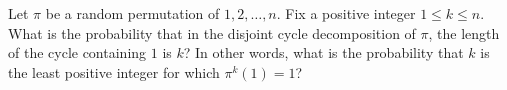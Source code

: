 Let $\pi$ be a random permutation of $1, 2, \dots, n$. Fix a positive integer $1 \le k \le n$.
What is the probability that in the disjoint cycle decomposition of $\pi$, the length of the cycle containing $1$ is $k$?
In other words, what is the probability that $k$ is the least positive integer for which $\pi^k(1) = 1$?

